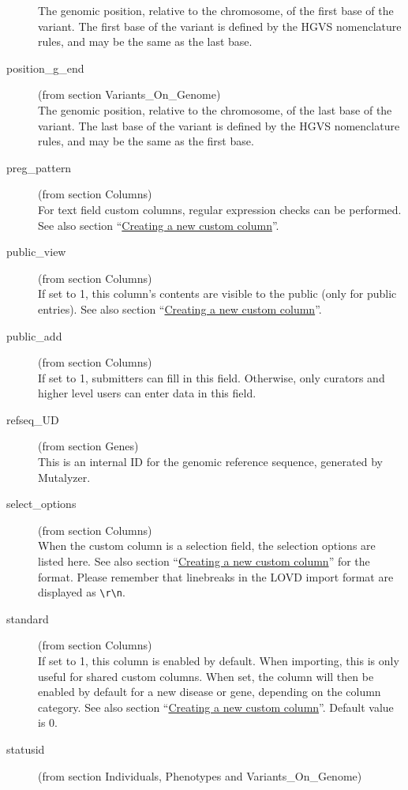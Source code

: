 \documentclass[a4paper,oneside,openany,12pt]{memoir}
\begin{document}
\begin{description}
  The genomic position, relative to the chromosome, of the first base of the variant.
  The first base of the variant is defined by the HGVS nomenclature rules, and may be the same as the last base.
  \item[position\_g\_end] (from section Variants\_On\_Genome)\hfill \\
  The genomic position, relative to the chromosome, of the last base of the variant.
  The last base of the variant is defined by the HGVS nomenclature rules, and may be the same as the first base.
  \item[preg\_pattern] (from section Columns)\hfill \\
  For text field custom columns, regular expression checks can be performed.
  See also section ``\hyperlink{sec:custom_column_create}{Creating a new custom column}''.
  \item[public\_view] (from section Columns)\hfill \\
  If set to 1, this column's contents are visible to the public (only for public entries).
  See also section ``\hyperlink{sec:custom_column_create}{Creating a new custom column}''.
  \item[public\_add] (from section Columns)\hfill \\
  If set to 1, submitters can fill in this field.
  Otherwise, only curators and higher level users can enter data in this field.
  \item[refseq\_UD] (from section Genes)\hfill \\
  This is an internal ID for the genomic reference sequence, generated by Mutalyzer.
  \item[select\_options] (from section Columns)\hfill \\
  When the custom column is a selection field, the selection options are listed here.
  See also section ``\hyperlink{sec:custom_column_create}{Creating a new custom column}'' for the format.
  Please remember that linebreaks in the LOVD import format are displayed as \texttt{\textbackslash{}r\textbackslash{}n}.
  \item[standard] (from section Columns)\hfill \\
  If set to 1, this column is enabled by default.
  When importing, this is only useful for shared custom columns.
  When set, the column will then be enabled by default for a new disease or gene, depending on the column category.
  See also section ``\hyperlink{sec:custom_column_create}{Creating a new custom column}''.
  Default value is 0.
  \item[statusid] (from section Individuals, Phenotypes and Variants\_On\_Genome)\hfill \\

\end{description}
\end{document}
